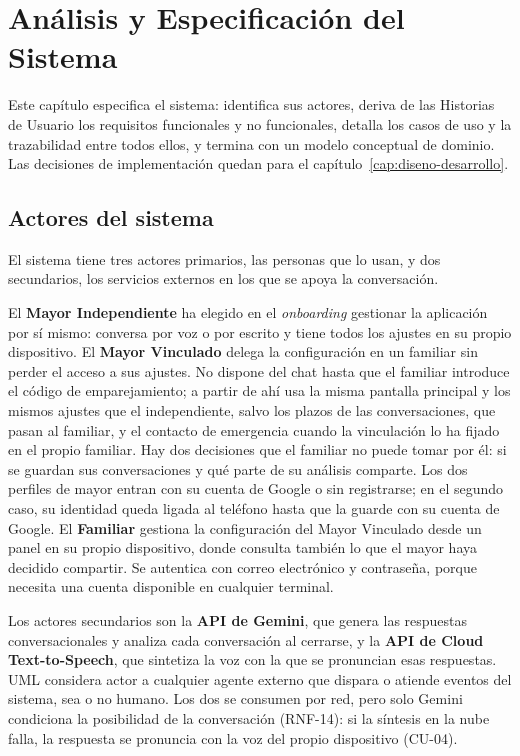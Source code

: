 \chapter{Análisis y Especificación del Sistema}
\label{cap:analisis}

Este capítulo especifica el sistema: identifica sus actores, deriva de las Historias de Usuario los requisitos funcionales y no funcionales, detalla los casos de uso y la trazabilidad entre todos ellos, y termina con un modelo conceptual de dominio. Las decisiones de implementación quedan para el capítulo~\ref{cap:diseno-desarrollo}.

\section{Actores del sistema}

El sistema tiene tres actores primarios, las personas que lo usan, y dos secundarios, los servicios externos en los que se apoya la conversación.

El \textbf{Mayor Independiente} ha elegido en el \textit{onboarding} gestionar la aplicación por sí mismo: conversa por voz o por escrito y tiene todos los ajustes en su propio dispositivo. El \textbf{Mayor Vinculado} delega la configuración en un familiar sin perder el acceso a sus ajustes. No dispone del chat hasta que el familiar introduce el código de emparejamiento; a partir de ahí usa la misma pantalla principal y los mismos ajustes que el independiente, salvo los plazos de las conversaciones, que pasan al familiar, y el contacto de emergencia cuando la vinculación lo ha fijado en el propio familiar. Hay dos decisiones que el familiar no puede tomar por él: si se guardan sus conversaciones y qué parte de su análisis comparte. Los dos perfiles de mayor entran con su cuenta de Google o sin registrarse; en el segundo caso, su identidad queda ligada al teléfono hasta que la guarde con su cuenta de Google. El \textbf{Familiar} gestiona la configuración del Mayor Vinculado desde un panel en su propio dispositivo, donde consulta también lo que el mayor haya decidido compartir. Se autentica con correo electrónico y contraseña, porque necesita una cuenta disponible en cualquier terminal.

Los actores secundarios son la \textbf{API de Gemini}, que genera las respuestas conversacionales y analiza cada conversación al cerrarse, y la \textbf{API de Cloud Text-to-Speech}, que sintetiza la voz con la que se pronuncian esas respuestas. UML considera actor a cualquier agente externo que dispara o atiende eventos del sistema, sea o no humano. Los dos se consumen por red, pero solo Gemini condiciona la posibilidad de la conversación (RNF-14): si la síntesis en la nube falla, la respuesta se pronuncia con la voz del propio dispositivo (CU-04).

